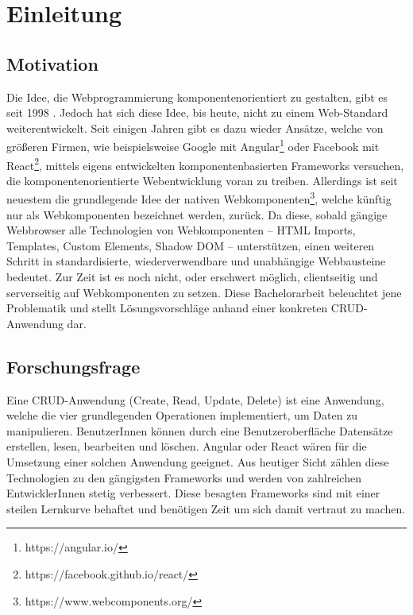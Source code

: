 \chapter{Einleitung}

\section{Motivation}

Die Idee, die Webprogrammierung komponentenorientiert zu gestalten, gibt es seit 1998 \cite{microsoft-webcomponents}. Jedoch hat sich diese Idee, bis heute, nicht zu einem Web-Standard weiterentwickelt.
Seit einigen Jahren gibt es dazu wieder Ansätze, welche von größeren Firmen, wie beispielsweise Google mit Angular\footnote{https://angular.io/} oder Facebook mit React\footnote{https://facebook.github.io/react/}, mittels eigens entwickelten komponentenbasierten Frameworks versuchen, die komponentenorientierte Webentwicklung voran zu treiben. 
Allerdings ist seit neuestem die grundlegende Idee der nativen Webkomponenten\footnote{https://www.webcomponents.org/}, welche künftig nur als Webkomponenten bezeichnet werden, zurück. Da diese, sobald gängige Webbrowser alle Technologien von Webkomponenten -- HTML Imports, Templates, Custom Elements, Shadow DOM -- unterstützen, einen weiteren Schritt in standardisierte, wiederverwendbare und unabhängige Webbausteine bedeutet. Zur Zeit ist es noch nicht, oder erschwert möglich, clientseitig und  serverseitig auf Webkomponenten zu setzen.
Diese Bachelorarbeit beleuchtet jene Problematik und stellt Lösungsvorschläge anhand einer konkreten CRUD-Anwendung dar.


\section{Forschungsfrage}
\label{sec:hintergrund}

Eine CRUD-Anwendung (Create, Read, Update, Delete) ist eine Anwendung, welche die vier grundlegenden Operationen implementiert, um Daten zu manipulieren. BenutzerInnen können durch eine Benutzeroberfläche Datensätze erstellen, lesen, bearbeiten und löschen. 
Angular oder React wären für die Umsetzung einer solchen Anwendung geeignet. Aus heutiger Sicht zählen diese Technologien zu den gängigsten Frameworks und werden von zahlreichen EntwicklerInnen stetig verbessert.
Diese besagten Frameworks sind mit einer steilen Lernkurve behaftet und benötigen Zeit um sich damit vertraut zu machen.

